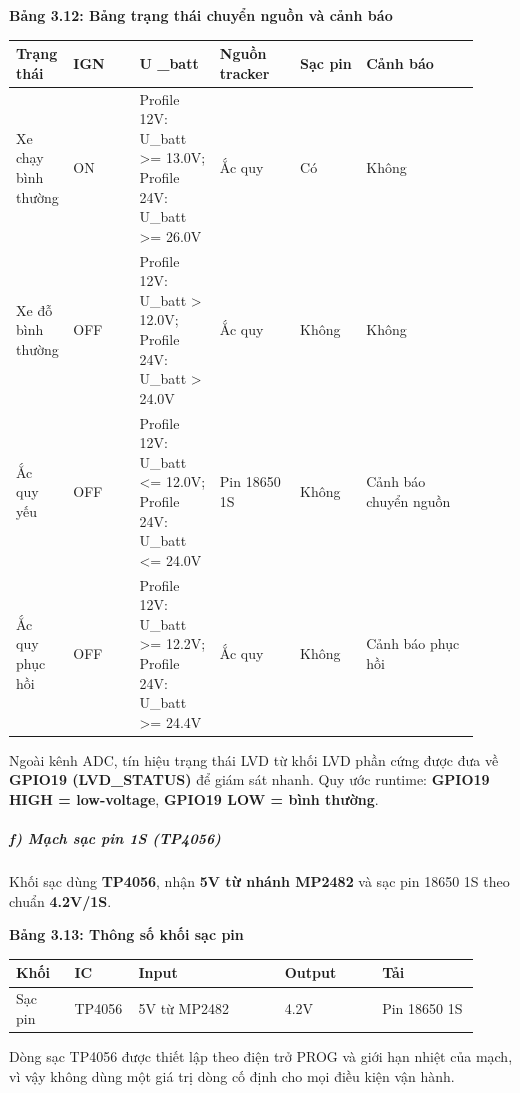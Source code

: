 \documentclass[13pt,a4paper]{extarticle}
\newcounter{none} %
\newcommand{\thesislongtableorignewline}{}
\let\thesislongtableorignewline\\
\renewcommand{\\}{\thesislongtableorignewline\hline}%
\let\\\thesislongtableorignewline
\newcommand{\thesistabletitle}[1]{%
  \begin{center}\textbf{#1}\end{center}%
}
\begin{document}
\thesistabletitle{Bảng 3.12: Bảng trạng thái chuyển nguồn và cảnh báo}

{\def\LTcaptype{none} %
\begin{longtable}{|p{0.06\linewidth}|p{0.14\linewidth}|p{0.17\linewidth}|p{0.17\linewidth}|p{0.14\linewidth}|p{0.24\linewidth}|}
\hline \textbf{Trạng thái} & \textbf{IGN} & \textbf{U} \_batt & Nguồn tracker & Sạc pin & Cảnh báo \\
\hline
\endhead
\hline
\endlastfoot
Xe chạy bình thường & ON & Profile 12V: U\_batt \textgreater= 13.0V;
Profile 24V: U\_batt \textgreater= 26.0V & Ắc quy & Có & Không \\
Xe đỗ bình thường & OFF & Profile 12V: U\_batt \textgreater{} 12.0V;
Profile 24V: U\_batt \textgreater{} 24.0V & Ắc quy & Không & Không \\
Ắc quy yếu & OFF & Profile 12V: U\_batt \textless= 12.0V; Profile 24V:
U\_batt \textless= 24.0V & Pin 18650 1S & Không & Cảnh báo chuyển
nguồn \\
Ắc quy phục hồi & OFF & Profile 12V: U\_batt \textgreater= 12.2V;
Profile 24V: U\_batt \textgreater= 24.4V & Ắc quy & Không & Cảnh báo
phục hồi \\
\end{longtable}
}

Ngoài kênh ADC, tín hiệu trạng thái LVD từ khối LVD phần cứng được đưa về
\textbf{GPIO19 (LVD\_STATUS)} để giám sát nhanh. Quy ước runtime:
\textbf{GPIO19 HIGH = low-voltage}, \textbf{GPIO19 LOW = bình thường}.

\subparagraph{f) Mạch sạc pin 1S
(TP4056)}\label{f-mux1ea1ch-sux1ea1c-pin-1s-tp4056}

Khối sạc dùng \textbf{TP4056}, nhận \textbf{5V từ nhánh MP2482} và sạc
pin 18650 1S theo chuẩn \textbf{4.2V/1S}.

\thesistabletitle{Bảng 3.13: Thông số khối sạc pin}

{\def\LTcaptype{none} %
\begin{longtable}{|p{0.12\linewidth}|p{0.10\linewidth}|p{0.30\linewidth}|p{0.20\linewidth}|p{0.20\linewidth}|}
\hline \textbf{Khối} & \textbf{IC} & \textbf{Input} & \textbf{Output} & \textbf{Tải} \\
\hline
\endhead
\hline
\endlastfoot
Sạc pin & TP4056 & 5V từ MP2482 & 4.2V & Pin 18650 1S \\
\end{longtable}
}

Dòng sạc TP4056 được thiết lập theo điện trở PROG và giới hạn nhiệt của
mạch, vì vậy không dùng một giá trị dòng cố định cho mọi điều kiện vận
hành.
\end{document}
